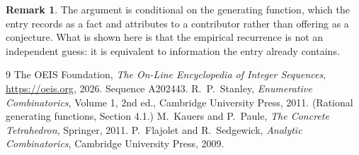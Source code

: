 \documentclass[11pt,a4paper]{article}
\theoremstyle{plain}
\theoremstyle{definition}
\newtheorem{remark}[theorem]{Remark}
\begin{document}
\begin{remark}
The argument is conditional on the generating function, which the entry records as a fact and
attributes to a contributor rather than offering as a conjecture. What is shown here is that
the empirical recurrence is not an independent guess: it is equivalent to information the
entry already contains.
\end{remark}

\begin{thebibliography}{9}
 The OEIS Foundation, \emph{The On-Line Encyclopedia of Integer
Sequences}, \url{https://oeis.org}, 2026. Sequence A202443.
 R.~P.~Stanley, \emph{Enumerative Combinatorics}, Volume 1, 2nd ed.,
Cambridge University Press, 2011. (Rational generating functions, Section 4.1.)
 M.~Kauers and P.~Paule, \emph{The Concrete Tetrahedron}, Springer, 2011.
 P.~Flajolet and R.~Sedgewick, \emph{Analytic Combinatorics}, Cambridge
University Press, 2009.
\end{thebibliography}
\end{document}
